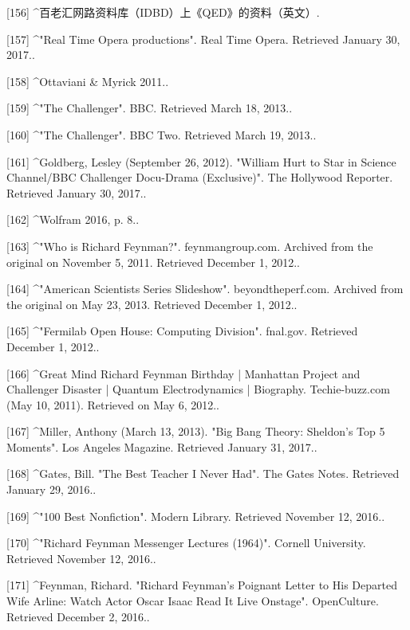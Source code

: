 [156]
^百老汇网路资料库（IDBD）上《QED》的资料（英文）.

[157]
^"Real Time Opera productions". Real Time Opera. Retrieved January 30, 2017..

[158]
^Ottaviani & Myrick 2011..

[159]
^"The Challenger". BBC. Retrieved March 18, 2013..

[160]
^"The Challenger". BBC Two. Retrieved March 19, 2013..

[161]
^Goldberg, Lesley (September 26, 2012). "William Hurt to Star in Science Channel/BBC Challenger Docu-Drama (Exclusive)". The Hollywood Reporter. Retrieved January 30, 2017..

[162]
^Wolfram 2016, p. 8..

[163]
^"Who is Richard Feynman?". feynmangroup.com. Archived from the original on November 5, 2011. Retrieved December 1, 2012..

[164]
^"American Scientists Series Slideshow". beyondtheperf.com. Archived from the original on May 23, 2013. Retrieved December 1, 2012..

[165]
^"Fermilab Open House: Computing Division". fnal.gov. Retrieved December 1, 2012..

[166]
^Great Mind Richard Feynman Birthday | Manhattan Project and Challenger Disaster | Quantum Electrodynamics | Biography. Techie-buzz.com (May 10, 2011). Retrieved on May 6, 2012..

[167]
^Miller, Anthony (March 13, 2013). "Big Bang Theory: Sheldon's Top 5 Moments". Los Angeles Magazine. Retrieved January 31, 2017..

[168]
^Gates, Bill. "The Best Teacher I Never Had". The Gates Notes. Retrieved January 29, 2016..

[169]
^"100 Best Nonfiction". Modern Library. Retrieved November 12, 2016..

[170]
^"Richard Feynman Messenger Lectures (1964)". Cornell University. Retrieved November 12, 2016..

[171]
^Feynman, Richard. "Richard Feynman's Poignant Letter to His Departed Wife Arline: Watch Actor Oscar Isaac Read It Live Onstage". OpenCulture. Retrieved December 2, 2016..
